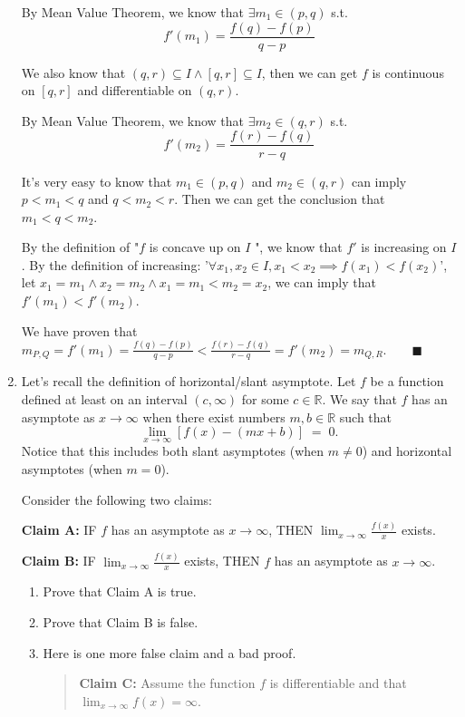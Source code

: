 \documentclass[12pt]{exam}
\newcommand {\DS} [1] {${\displaystyle #1}$}
\newcommand{\R}{\mathbb{R}}
\begin{document}
\begin{enumerate}
By Mean Value Theorem, we know that $\exists m_1\in(p,q)$ s.t.
$$
    f'(m_1)=\frac{f(q)-f(p)}{q-p}
$$

We also know that $(q,r)\subseteq I \land [q,r]\subseteq I$, then we can get $f$ is continuous on $[q,r]$ and differentiable on $(q,r)$.

By Mean Value Theorem, we know that $\exists m_2\in(q,r)$ s.t.
$$
    f'(m_2)=\frac{f(r)-f(q)}{r-q}
$$

It's very easy to know that $m_1\in(p,q)$ and $m_2\in(q,r)$ can imply $p<m_1<q$ and $q<m_2<r$. Then we can get the conclusion that $m_1<q<m_2$.

By the definition of "$f$ is concave up on $I$ ", we know that $f'$ is increasing on $I$. By the definition of increasing: '$\forall x_1, x_2\in I, x_1<x_2 \implies f(x_1)<f(x_2)$', let $x_1=m_1 \land x_2=m_2 \land x_1=m_1<m_2=x_2$, we can imply that $f'(m_1)<f'(m_2)$.

We have proven that $m_{P,Q}=f'(m_1)=\frac{f(q)-f(p)}{q-p} < \frac{f(r)-f(q)}{r-q}=f'(m_2)=m_{Q,R}. \qquad\blacksquare$

\newpage

\item  Let's recall the definition of horizontal/slant asymptote.  Let $f$ be a function defined at least on an interval $(c,\infty)$ for some $c \in \R$.
We say that $f$ has an asymptote as $x \to \infty$ when there exist numbers $m, b \in \R$ such that
	$$	
		\lim_{x \to \infty} \left[ f(x) - \left( mx + b \right) \right] \; = \; 0.
	$$
Notice that this includes both slant asymptotes (when $m \neq 0$) and horizontal asymptotes (when $m =0$).
	
Consider the following two claims:	
			\begin{center}
				{\bf Claim A:} \quad \quad
					IF $f$ has an asymptote as $x \to \infty$,  \quad
					THEN \DS{\lim_{x \to \infty} \frac{f(x)}{x}} exists.
				
				{\bf Claim B:} \quad \quad 		
					IF \DS{\lim_{x \to \infty} \frac{f(x)}{x}} exists, \quad
					THEN $f$ has an asymptote as $x \to \infty$.
			\end{center}
	\begin{enumerate}
		\item Prove that Claim A is true.
		\item Prove that Claim B is false.

		\item  Here is one more false claim and a bad proof.
			\begin{quotation}
				\noindent
				{\bf Claim C:} Assume the function $f$ is differentiable and that \DS{\lim_{x \to \infty} f(x) = \infty}.
				

\end{quotation}
\end{enumerate}
\end{enumerate}
\end{document}
